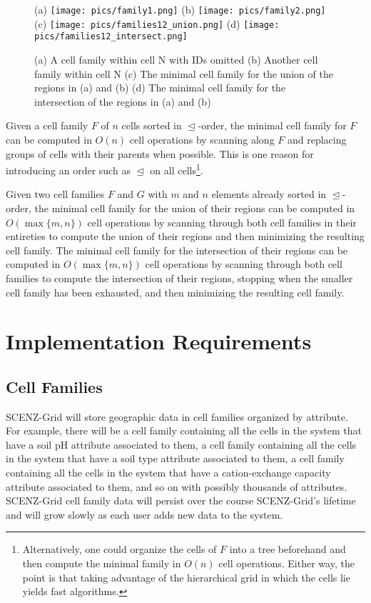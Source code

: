 \documentclass[12pt,a4paper]{amsart}
\numberwithin{figure}{section}
\newcommand{\cle}{\trianglelefteq}
\begin{document}
\begin{figure}[htb]
(a) \texttt{[image: pics/family1.png]} 
(b) \texttt{[image: pics/family2.png]} \\
(c) \texttt{[image: pics/families12\_union.png]}
(d) \texttt{[image: pics/families12\_intersect.png]}
\caption{
(a) A cell family within cell N with IDs omitted 
(b) Another cell family within cell N
(c) The minimal cell family for the union of the regions in (a) and (b)
(d) The minimal cell family for the intersection of the regions in (a) and (b)
}
\end{figure}
\label{fig:union}

Given a cell family $F$ of $n$ cells sorted in $\cle$-order, the minimal cell family for $F$ can be computed in $O(n)$ cell operations by scanning along $F$ and replacing groups of cells with their parents when possible.
This is one reason for introducing an order such as $\cle$ on all cells\footnote{
Alternatively, one could organize the cells of $F$ into a tree beforehand and then compute the minimal family in $O(n)$ cell operations.
Either way, the point is that taking advantage of the hierarchical grid in which the cells lie yields fast algorithms. 
}.

Given two cell families $F$ and $G$ with $m$ and $n$ elements already sorted in $\cle$-order, the minimal cell family for the union of their regions can be computed in $O(\max\{m, n\})$ cell operations by scanning through both cell families in their entireties to compute the union of their regions and then minimizing the resulting cell family.
The minimal cell family for the intersection of their regions can be computed in $O(\max\{m, n\})$ cell operations by scanning through both cell families to compute the intersection of their regions, stopping when the smaller cell family has been exhausted, and then minimizing the resulting cell family.

\section{Implementation Requirements}\label{sec:implementation}

\subsection{Cell Families}
SCENZ-Grid will store geographic data in cell families organized by attribute.
For example, there will be a cell family containing all the cells in the system that have a soil pH attribute associated to them, a cell family containing all the cells in the system that have a soil type attribute associated to them, a cell family containing all the cells in the system that have a cation-exchange capacity attribute associated to them, and so on with possibly thousands of attributes.   
SCENZ-Grid cell family data will persist over the course SCENZ-Grid's lifetime and will grow slowly as each user adds new data to the system.
\end{document}
